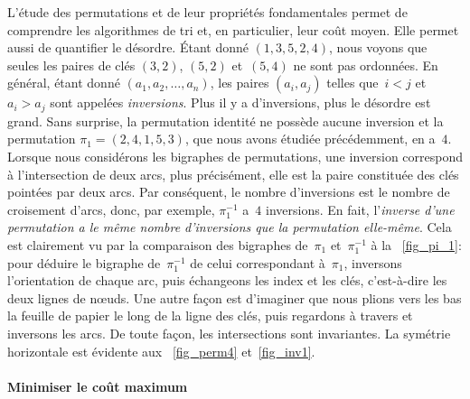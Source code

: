 L'étude des permutations et de leur propriétés fondamentales permet de
comprendre les algorithmes de tri et, en particulier, leur coût
moyen. Elle permet aussi de quantifier le désordre. Étant donné
\((1,3,5,2,4)\), nous voyons que seules les paires de clés \((3,2)\),
\((5,2)\) et~\((5,4)\) ne sont pas ordonnées. En général, étant donné
\((a_1, a_2, \dots, a_n)\), les paires \((a_i,a_j)\) telles que~\(i <
j\) et~\(a_i > a_j\) sont appelées
\emph{inversions}. Plus il y a
d'inversions, plus le désordre est grand. Sans surprise, la
permutation identité ne possède aucune
inversion et la permutation \(\pi_1 = (2,4,1,5,3)\), que nous avons
étudiée précédemment, en a~\(4\). Lorsque nous considérons les
bigraphes de permutations, une
inversion correspond à l'intersection de
deux arcs, plus précisément, elle est la paire constituée des clés
pointées par deux arcs. Par conséquent, le nombre d'inversions
 est le nombre de croisement d'arcs,
donc, par exemple, \(\pi_1^{-1}\) a~\(4\) inversions. En fait,
l'\emph{inverse d'une permutation a le même
  nombre d'inversions que la
  permutation elle-même}. Cela est clairement vu
par la comparaison des bigraphes
de~\(\pi_1\) et~\(\pi_1^{-1}\) à la \fig~\vref{fig_pi_1}: pour déduire
le bigraphe de~\(\pi_1^{-1}\) de celui correspondant à~\(\pi_1\),
inversons l'orientation de chaque arc, puis échangeons les index et
les clés, c'est-à-dire les deux lignes de n{\oe}uds. Une autre façon
est d'imaginer que nous plions vers les bas la feuille de papier le
long de la ligne des clés, puis regardons à travers et inversons les
arcs. De toute façon, les intersections sont invariantes. La symétrie
horizontale est évidente aux \figs~\ref{fig_perm4} et~\ref{fig_inv1}.

\paragraph{Minimiser le coût maximum}
\label{par_minimax}

